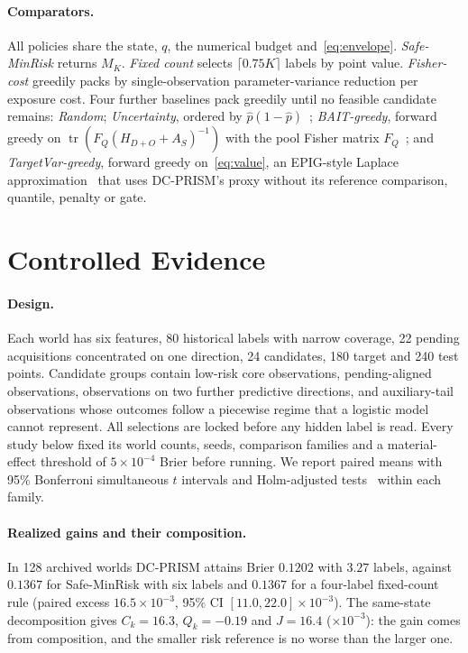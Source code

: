 \documentclass[runningheads]{llncs}
\begin{document}
\paragraph{Comparators.} All policies share the state, $q$, the numerical budget and~\eqref{eq:envelope}. \emph{Safe-MinRisk} returns $M_K$. \emph{Fixed count} selects $\lceil0.75K\rceil$ labels by point value. \emph{Fisher-cost} greedily packs by single-observation parameter-variance reduction per exposure cost. Four further baselines pack greedily until no feasible candidate remains: \emph{Random}; \emph{Uncertainty}, ordered by $\widehat p(1-\widehat p)$~\cite{lewis1994sequential}; \emph{BAIT-greedy}, forward greedy on $\operatorname{tr}(F_Q(H_{D+O}+A_S)^{-1})$ with the pool Fisher matrix $F_Q$~\cite{ash2021fishing}; and \emph{TargetVar-greedy}, forward greedy on~\eqref{eq:value}, an EPIG-style Laplace approximation~\cite{bickfordsmith2023prediction} that uses DC-PRISM's proxy without its reference comparison, quantile, penalty or gate.

\section{Controlled Evidence}
\label{sec:controlled}
\paragraph{Design.} Each world has six features, 80 historical labels with narrow coverage, 22 pending acquisitions concentrated on one direction, 24 candidates, 180 target and 240 test points. Candidate groups contain low-risk core observations, pending-aligned observations, observations on two further predictive directions, and auxiliary-tail observations whose outcomes follow a piecewise regime that a logistic model cannot represent. All selections are locked before any hidden label is read. Every study below fixed its world counts, seeds, comparison families and a material-effect threshold of $5\times10^{-4}$ Brier before running. We report paired means with 95\% Bonferroni simultaneous $t$ intervals and Holm-adjusted tests~\cite{holm1979simple} within each family.

\paragraph{Realized gains and their composition.} In 128 archived worlds DC-PRISM attains Brier $0.1202$ with $3.27$ labels, against $0.1367$ for Safe-MinRisk with six labels and $0.1367$ for a four-label fixed-count rule (paired excess $16.5\times10^{-3}$, 95\% CI $[11.0,22.0]\times10^{-3}$). The same-state decomposition gives $C_k=16.3$, $Q_k=-0.19$ and $J=16.4$ ($\times10^{-3}$): the gain comes from composition, and the smaller risk reference is no worse than the larger one.
\end{document}
